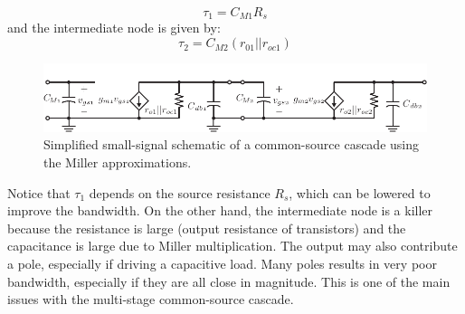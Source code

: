     \begin{equation}
        \tau_1 = C_{M1} R_s 
    \end{equation}
and the intermediate node is given by:
    \begin{equation} 
        \tau_2 = C_{M2} (r_{01} || r_{oc1}) 
    \end{equation}
\begin{figure}[tb]
\centering
\includegraphics[scale=1]{4cs_casc_ss_cap_miller}
\caption{Simplified small-signal schematic of a common-source cascade using the Miller approximations.} \label{fig:4cs_casc_ss_cap_miller}
\end{figure}
Notice that $\tau_1$ depends on the source resistance $R_s$, which can be lowered to improve the bandwidth.  On the other hand,  the intermediate node is a killer because the resistance is large (output resistance of transistors) and the capacitance is large due to Miller multiplication.   The output may also contribute a pole, especially if driving a capacitive load.  Many poles results in very poor bandwidth, especially if they are all close in magnitude.  This is one of the main issues with the multi-stage common-source cascade.
